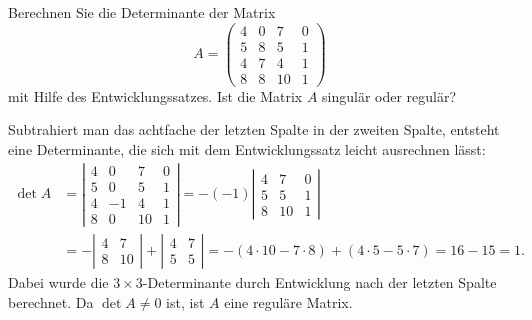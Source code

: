 Berechnen Sie die Determinante der Matrix
\[
A=\begin{pmatrix}
    4 &  0 &  7 &  0 \\
    5 &  8 &  5 &  1 \\
    4 &  7 &  4 &  1 \\
    8 &  8 & 10 &  1 
\end{pmatrix}
\]
mit Hilfe des Entwicklungssatzes. Ist die Matrix $A$ singulär oder regulär?


\begin{loesung}
Subtrahiert man das achtfache der letzten Spalte in der zweiten Spalte,
entsteht eine Determinante, die sich mit dem Entwicklungssatz leicht
ausrechnen lässt:
\begin{align*}
\det A
&=
\left|\begin{matrix}
    4 &  0 &  7 &  0 \\
    5 &  0 &  5 &  1 \\
    4 & -1 &  4 &  1 \\
    8 &  0 & 10 &  1 
\end{matrix}\right|
=
-(-1)\left|\begin{matrix}
    4 &  7 &  0 \\
    5 &  5 &  1 \\
    8 & 10 &  1 
\end{matrix}\right|
\\
&=
-\left|\begin{matrix}
    4 &  7\\
    8 & 10
\end{matrix}\right|
+\left|\begin{matrix}
    4 &  7\\
    5 &  5
\end{matrix}\right|
=
-(4\cdot 10-7\cdot 8)+(4\cdot 5-5\cdot 7)
=
16-15=1.
\end{align*}
Dabei wurde die $3\times 3$-Determinante durch Entwicklung nach der letzten
Spalte berechnet. Da $\det A \neq 0$ ist, ist $A$ eine reguläre Matrix.
\end{loesung}


